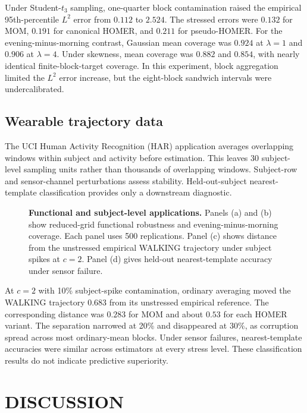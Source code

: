 \documentclass[twoside]{article}
\theoremstyle{definition}
\begin{document}
Under Student-$t_3$ sampling, one-quarter block contamination raised the empirical 95th-percentile $L^2$ error from $0.112$ to $2.524$. The stressed errors were $0.132$ for MOM, $0.191$ for canonical HOMER, and $0.211$ for pseudo-HOMER. For the evening-minus-morning contrast, Gaussian mean coverage was $0.924$ at $\lambda=1$ and $0.906$ at $\lambda=4$. Under skewness, mean coverage was $0.882$ and $0.854$, with nearly identical finite-block-target coverage. In this experiment, block aggregation limited the $L^2$ error increase, but the eight-block sandwich intervals were undercalibrated.


\subsection{Wearable trajectory data}
The UCI Human Activity Recognition (HAR) application \citep{jorgereyes-ortiz_2013_HumanActivityRecognition} averages overlapping windows within subject and activity before estimation. This leaves 30 subject-level sampling units rather than thousands of overlapping windows. Subject-row and sensor-channel perturbations assess stability. Held-out-subject nearest-template classification provides only a downstream diagnostic.

\begin{figure}[t]
\centering
\resizebox{\textwidth}{!}{}
\caption{\textbf{Functional and subject-level applications.}
Panels (a) and (b) show reduced-grid functional robustness and evening-minus-morning coverage. Each panel uses 500 replications. Panel (c) shows distance from the unstressed empirical WALKING trajectory under subject spikes at $c=2$. Panel (d) gives held-out nearest-template accuracy under sensor failure.}
\label{fig:main-applications}
\end{figure}

At $c=2$ with 10\% subject-spike contamination, ordinary averaging moved the WALKING trajectory $0.683$ from its unstressed empirical reference. The corresponding distance was $0.283$ for MOM and about $0.53$ for each HOMER variant. The separation narrowed at 20\% and disappeared at 30\%, as corruption spread across most ordinary-mean blocks. Under sensor failures, nearest-template accuracies were similar across estimators at every stress level. These classification results do not indicate predictive superiority. 

\section{DISCUSSION}
\end{document}
